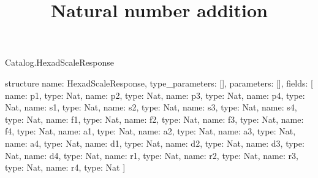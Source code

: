 \begin{lexlean}{Catalog.HexadScaleResponse}
\title{Natural number addition}
\begin{semanticmodule}
structure{
  name: HexadScaleResponse,
  type_parameters: [],
  parameters: [],
  fields: [
    {name: p1, type: Nat},
    {name: p2, type: Nat},
    {name: p3, type: Nat},
    {name: p4, type: Nat},
    {name: s1, type: Nat},
    {name: s2, type: Nat},
    {name: s3, type: Nat},
    {name: s4, type: Nat},
    {name: f1, type: Nat},
    {name: f2, type: Nat},
    {name: f3, type: Nat},
    {name: f4, type: Nat},
    {name: a1, type: Nat},
    {name: a2, type: Nat},
    {name: a3, type: Nat},
    {name: a4, type: Nat},
    {name: d1, type: Nat},
    {name: d2, type: Nat},
    {name: d3, type: Nat},
    {name: d4, type: Nat},
    {name: r1, type: Nat},
    {name: r2, type: Nat},
    {name: r3, type: Nat},
    {name: r4, type: Nat}
  ]
}
\end{semanticmodule}
\end{lexlean}
